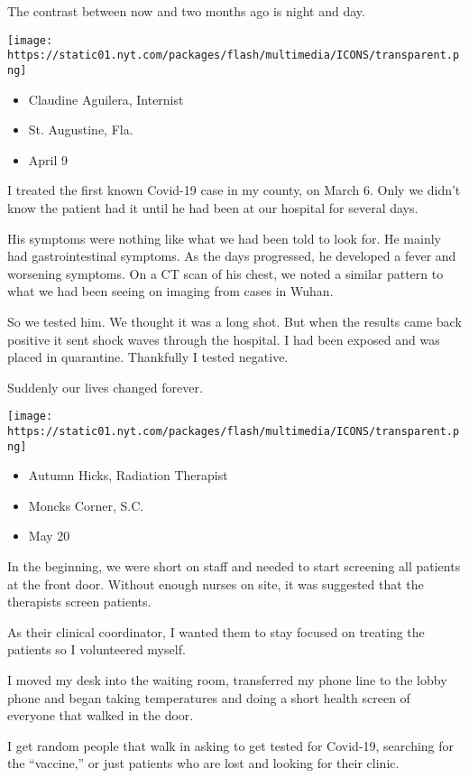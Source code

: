 The contrast between now and two months ago is night and day.

\texttt{[image: https://static01.nyt.com/packages/flash/multimedia/ICONS/transparent.png]}

\begin{itemize}
\tightlist
\item
  Claudine Aguilera, Internist
\item
  St. Augustine, Fla.
\item
  April 9
\end{itemize}

I treated the first known Covid-19 case in my county, on March 6. Only
we didn't know the patient had it until he had been at our hospital for
several days.

His symptoms were nothing like what we had been told to look for. He
mainly had gastrointestinal symptoms. As the days progressed, he
developed a fever and worsening symptoms. On a CT scan of his chest, we
noted a similar pattern to what we had been seeing on imaging from cases
in Wuhan.

So we tested him. We thought it was a long shot. But when the results
came back positive it sent shock waves through the hospital. I had been
exposed and was placed in quarantine. Thankfully I tested negative.

Suddenly our lives changed forever.

\texttt{[image: https://static01.nyt.com/packages/flash/multimedia/ICONS/transparent.png]}

\begin{itemize}
\tightlist
\item
  Autumn Hicks, Radiation Therapist
\item
  Moncks Corner, S.C.
\item
  May 20
\end{itemize}

In the beginning, we were short on staff and needed to start screening
all patients at the front door. Without enough nurses on site, it was
suggested that the therapists screen patients.

As their clinical coordinator, I wanted them to stay focused on treating
the patients so I volunteered myself.

I moved my desk into the waiting room, transferred my phone line to the
lobby phone and began taking temperatures and doing a short health
screen of everyone that walked in the door.

I get random people that walk in asking to get tested for Covid-19,
searching for the ``vaccine,'' or just patients who are lost and looking
for their clinic.

